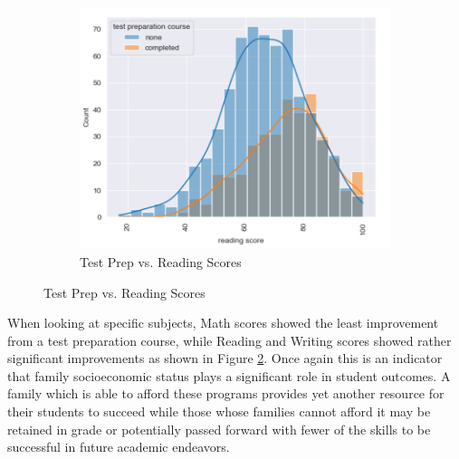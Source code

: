 \documentclass[man,floatsintext]{apa6} %
\begin{document}
\begin{figure}[H]
    \begin{subfigure}[b]{0.3\textwidth}
        \includegraphics[width=\linewidth]{TestPrepReading.png}
        \caption{Test Prep vs. Reading Scores}
        \label{fig:TestPrepRead}
    \end{subfigure}
    \label{fig:TestPrepGraphs}
\end{figure}
When looking at specific subjects, Math scores showed the least improvement from a test preparation course, while Reading and Writing scores showed rather significant improvements as shown in Figure \ref{fig:TestPrepGraphs}.  Once again this is an indicator that family socioeconomic status plays a significant role in student outcomes. A family which is able to afford these programs provides yet another resource for their students to succeed while those whose families cannot afford it may be retained in grade or potentially passed forward with fewer of the skills to be successful in future academic endeavors.
\end{document}
